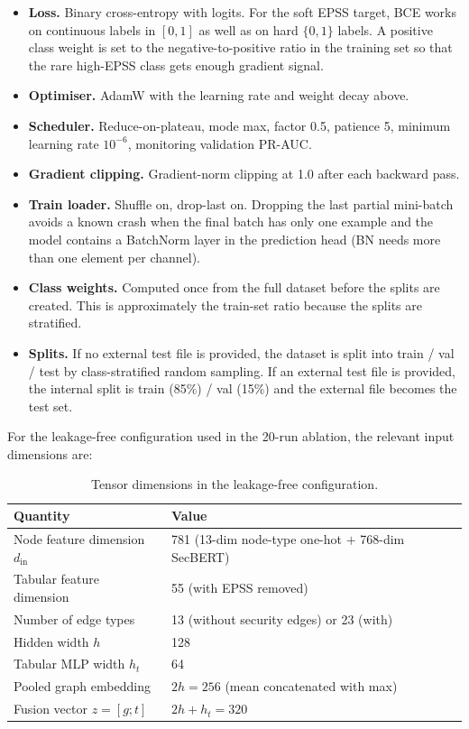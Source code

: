 \documentclass[11pt]{article}
\begin{document}
\begin{itemize}
    \item \textbf{Loss.} Binary cross-entropy with logits. For the soft
    EPSS target, BCE works on continuous labels in $[0, 1]$ as well as
    on hard $\{0, 1\}$ labels. A positive class weight is set to the
    negative-to-positive ratio in the training set so that the rare
    high-EPSS class gets enough gradient signal.
    \item \textbf{Optimiser.} AdamW with the learning rate and weight
    decay above.
    \item \textbf{Scheduler.} Reduce-on-plateau, mode max, factor 0.5,
    patience 5, minimum learning rate $10^{-6}$, monitoring validation
    PR-AUC.
    \item \textbf{Gradient clipping.} Gradient-norm clipping at 1.0
    after each backward pass.
    \item \textbf{Train loader.} Shuffle on, drop-last on. Dropping
    the last partial mini-batch avoids a known crash when the final
    batch has only one example and the model contains a BatchNorm
    layer in the prediction head (BN needs more than one element per
    channel).
    \item \textbf{Class weights.} Computed once from the full dataset
    before the splits are created. This is approximately the train-set
    ratio because the splits are stratified.
    \item \textbf{Splits.} If no external test file is provided, the
    dataset is split into train / val / test by class-stratified random
    sampling. If an external test file is provided, the internal split
    is train (85\%) / val (15\%) and the external file becomes the test
    set.
\end{itemize}

For the leakage-free configuration used in the 20-run ablation, the
relevant input dimensions are:

\begin{table}[h]
\centering
\small
\begin{tabular}{ll}
\toprule
Quantity & Value \\
\midrule
Node feature dimension $d_{\text{in}}$ & 781 (13-dim node-type one-hot $+$ 768-dim SecBERT) \\
Tabular feature dimension              & 55 (with EPSS removed) \\
Number of edge types                   & 13 (without security edges) or 23 (with) \\
Hidden width $h$                       & 128 \\
Tabular MLP width $h_t$                & 64 \\
Pooled graph embedding                 & $2h = 256$ (mean concatenated with max) \\
Fusion vector $z = [g; t]$             & $2h + h_t = 320$ \\
\bottomrule
\end{tabular}
\caption{Tensor dimensions in the leakage-free configuration.}
\end{table}
\end{document}
